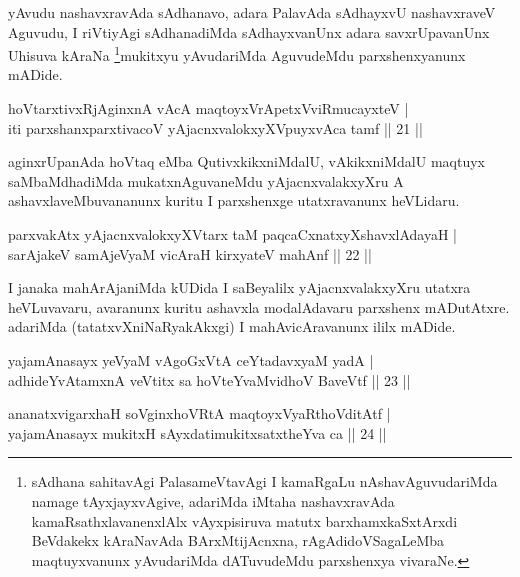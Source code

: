 \begin{artha}
yAvudu nashavxravAda sAdhanavo, adara PalavAda sAdhayxvU nashavxraveV Aguvudu, I riVtiyAgi sAdhanadiMda sAdhayxvanUnx adara savxrUpavanUnx Uhisuva kAraNa \footnote{sAdhana sahitavAgi PalasameVtavAgi I kamaRgaLu nAshavAguvudariMda namage tAyxjayxvAgive, adariMda iMtaha nashavxravAda kamaRsathxlavanenxlAlx vAyxpisiruva matutx barxhamxkaSxtArxdi BeVdakekx kAraNavAda BArxMtijAcnxna, rAgAdidoVSagaLeMba maqtuyxvanunx yAvudariMda dATuvudeMdu parxshenxya vivaraNe.}mukitxyu yAvudariMda AguvudeMdu parxshenxyanunx mADide.
\end{artha}


\begin{shl}
hoVtarxtivxRjA\s ginxnA vAcA maqtoyxVrApetxVviRmucayxteV |\\
iti parxshanxparxtivacoV yAjacnxvalokxyXV\s puyxvAca tamf \hfill || 21 ||
\end{shl}

\begin{artha}
aginxrUpanAda hoVtaq eMba QutivxkikxniMdalU, vAkikxniMdalU maqtuyx saMbaMdhadiMda mukatxnAguvaneMdu yAjacnxvalakxyXru A ashavxlaveMbuvananunx kuritu I parxshenxge utatxravanunx heVLidaru.
\end{artha}

\begin{shl}
parxvakAtx yAjacnxvalokxyXV\s tarx taM paqcaCxnatxyXshavxlAdayaH |\\
sarAjakeV samAjeV\s yaM vicAraH kirxyateV mahAnf \hfill || 22 ||
\end{shl}

\begin{artha}
I janaka mahArAjaniMda kUDida I saBeyalilx yAjacnxvalakxyXru utatxra heVLuvavaru, avaranunx kuritu ashavxla modalAdavaru parxshenx mADutAtxre. adariMda (tatatxvXniNaRyakAkxgi) I mahAvicAravanunx ililx mADide.
\end{artha}


\begin{shl}
yajamAnasayx yeVyaM vAgoGxVtA ceYtadavxyaM yadA |\\
adhideYvAtamxnA veVtitx sa hoVteYvaMvidhoV BaveVtf \hfill || 23 ||
\end{shl}

\begin{shl}
ananatxvigarxhaH soV\s ginxhoVRtA maqtoyxVyaRthoVditAtf |\\
yajamAnasayx mukitxH sAyxdatimukitxsatxtheYva ca \hfill || 24 ||
\end{shl}

